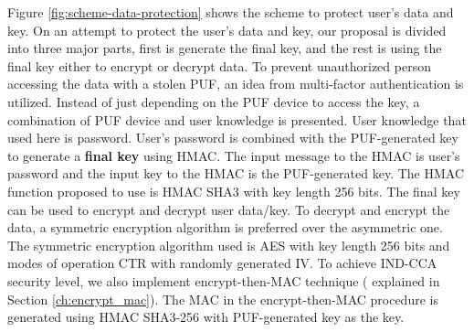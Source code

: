 Figure \ref{fig:scheme-data-protection} shows the scheme to protect user's data and key. On an attempt to protect the user's data and key, our proposal is divided into three major parts, first is generate the final key, and the rest is using the final key either to encrypt or decrypt data.
To prevent unauthorized person accessing the data with a stolen PUF, an idea from multi-factor authentication is utilized. Instead of just depending on the PUF device to access the key, a combination of PUF device and user knowledge is presented. User knowledge that used here is password.
User's password is combined with the PUF-generated key to generate a \textbf{final key} using HMAC. The input message to the HMAC is user's password and the input key to the HMAC is the PUF-generated key. The HMAC function proposed to use is HMAC SHA3 with key length 256 bits.
The final key can be used to encrypt and decrypt user data/key. To decrypt and encrypt the data, a symmetric encryption algorithm is preferred over the asymmetric one. The symmetric encryption algorithm used is AES with key length 256 bits and modes of operation CTR with randomly generated IV. To achieve IND-CCA security level, we also implement encrypt-then-MAC technique ( explained in Section \ref{ch:encrypt_mac}). The MAC in the encrypt-then-MAC procedure is generated using HMAC SHA3-256 with PUF-generated key as the key.

